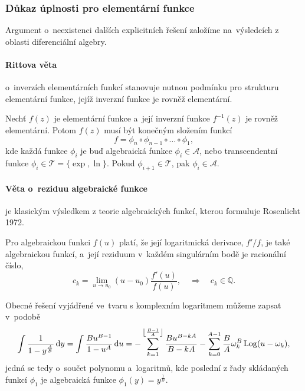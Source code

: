 \subsubsection{Důkaz úplnosti pro elementární funkce}\label{sss:dukaz_uplnosti_pro_elementarni_funkce}
Argument o~neexistenci dalších explicitních řešení založíme na~výsledcích z oblasti diferenciální algebry.

\paragraph{Rittova věta} o~inverzích elementárních funkcí stanovuje nutnou podmínku pro strukturu elementární funkce, jejíž inverzní funkce je rovněž elementární. 

\begin{theorem}
Nechť $f(z)$ je elementární funkce a~její inverzní funkce $f^{-1}(z)$ je rovněž elementární. Potom $f(z)$ musí být konečným složením funkcí
$$ f=\phi_n \circ \phi_{n-1} \circ \dots \circ \phi_1, $$
kde každá funkce $\phi_i$ je buď algebraická funkce $\phi_i\in\mathcal{A}$, nebo transcendentní funkce $\phi_i\in\mathcal{T}=\{\exp,\ln\}$. Pokud $\phi_{i+1}\in\mathcal{T}$, pak $\phi_{i}\in\mathcal{A}$.
\end{theorem}

\paragraph{Věta o~reziduu algebraické funkce} je klasickým výsledkem z teorie algebraických funkcí, kterou formuluje Rosenlicht 1972. 

\begin{theorem}
    Pro algebraickou funkci $f(u)$ platí, že její logaritmická derivace, ${f'}/{f}$, je také algebraickou funkcí, a~její reziduum v~každém singulárním bodě je racionální číslo,
    $$ c_k = \lim_{u\to u_0} (u-u_0)\frac{f'(u)}{f(u)},\quad\Longrightarrow\quad c_k\in \mathbb{Q}.$$
\end{theorem}

Obecné řešení vyjádřené ve~tvaru s komplexním logaritmem můžeme zapsat v~podobě
\begin{equation}
    \int\frac{1}{1-y^{\frac{A}{B}}}\,\mathrm{d}{y}=\int\frac{Bu^{B-1}}{1-u^A}\,\mathrm{d}{u}=-\sum_{k=1}^{\left\lfloor\frac{B-1}{A}\right\rfloor}\frac{Bu^{B-kA}}{B-kA}-\sum_{k=0}^{A-1}\frac{B}{A}\omega_k^B\operatorname{Log}(u-\omega_k),
\end{equation}
jedná se tedy o~součet polynomu a~logaritmů, kde poslední z řady skládaných funkcí $\phi_1$ je algebraická funkce $\phi_1(y)=y^{\frac{1}{B}}$.

